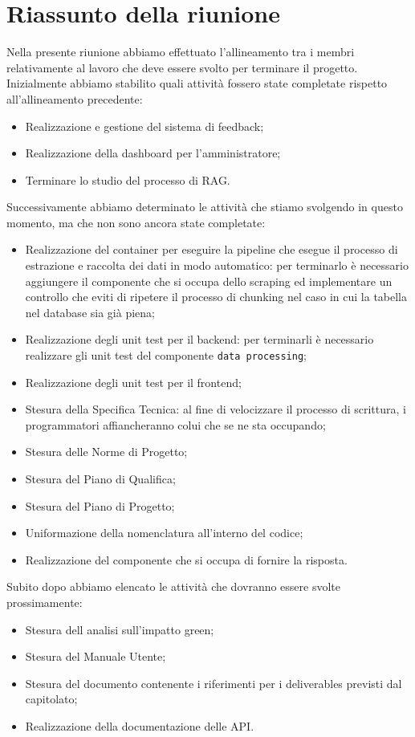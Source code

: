 \section{Riassunto della riunione}
Nella presente riunione abbiamo effettuato l'allineamento tra i membri relativamente al lavoro che deve essere svolto per terminare il progetto.
Inizialmente abbiamo stabilito quali attività fossero state completate rispetto all'allineamento precedente:
\begin{itemize}
    \item Realizzazione e gestione del sistema di feedback;
    \item Realizzazione della dashboard per l'amministratore;
    \item Terminare lo studio del processo di RAG.
\end{itemize}
Successivamente abbiamo determinato le attività che stiamo svolgendo in questo momento, ma che non sono ancora state completate:
\begin{itemize}
    \item Realizzazione del container per eseguire la pipeline che esegue il processo di estrazione e raccolta dei dati in modo automatico: per terminarlo è necessario aggiungere il componente che si occupa dello scraping ed implementare un controllo che eviti di ripetere il processo di chunking nel caso in cui la tabella nel database sia già piena;
    \item Realizzazione degli unit test per il backend: per terminarli è necessario realizzare gli unit test del componente \texttt{data processing};
    \item Realizzazione degli unit test per il frontend;
    \item Stesura della Specifica Tecnica: al fine di velocizzare il processo di scrittura, i programmatori affiancheranno colui che se ne sta occupando;
    \item Stesura delle Norme di Progetto;
    \item Stesura del Piano di Qualifica;
    \item Stesura del Piano di Progetto;
    \item Uniformazione della nomenclatura all'interno del codice;
    \item Realizzazione del componente che si occupa di fornire la risposta.
\end{itemize}
Subito dopo abbiamo elencato le attività che dovranno essere svolte prossimamente:
\begin{itemize}
    \item Stesura dell analisi sull'impatto green;
    \item Stesura del Manuale Utente;
    \item Stesura del documento contenente i riferimenti per i deliverables previsti dal capitolato;
    \item Realizzazione della documentazione delle API.
\end{itemize}
